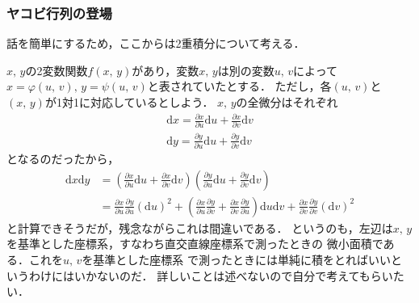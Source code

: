 \subsubsection{ヤコビ行列の登場}
話を簡単にするため，ここからは2重積分について考える．

$x, \, y$の2変数関数$f(x, \, y)$があり，変数$x, \, y$は別の変数$u, \, v$によって
$x=\varphi (u, \, v), \, y=\psi (u, \, v)$と表されていたとする．
ただし，各$(u, \, v)$と$(x, \, y)$が1対1に対応しているとしよう．
$x, \, y$の全微分はそれぞれ
\begin{align*}
\mathrm{d} x = \frac{\partial x}{\partial u} \mathrm{d}u + \frac{\partial x}{\partial v} \mathrm{d}v \\
\mathrm{d} y = \frac{\partial y}{\partial u} \mathrm{d}u + \frac{\partial y}{\partial v} \mathrm{d}v
\end{align*}
となるのだったから，
\begin{align*}
\mathrm{d}x \mathrm{d}y & = \left( 
\frac{\partial x}{\partial u} \mathrm{d}u + \frac{\partial x}{\partial v} \mathrm{d}v \right) 
\left( \frac{\partial y}{\partial u} \mathrm{d}u + \frac{\partial y}{\partial v} \mathrm{d}v \right) \\
& = \frac{\partial x}{\partial u} \frac{\partial y}{\partial u} (\mathrm{d}u)^2
+ \left( \frac{\partial x}{\partial u}\frac{\partial y}{\partial v} + 
\frac{\partial x}{\partial v}\frac{\partial y}{\partial u} \right) \mathrm{d}u \mathrm{d}v +
\frac{\partial x}{\partial v}\frac{\partial y}{\partial v} (\mathrm{d}v)^2
\end{align*}
と計算できそうだが，残念ながらこれは間違いである．
というのも，左辺は$x, \, y$を基準とした座標系，すなわち直交直線座標系で測ったときの
微小面積である．これを$u, \, v$を基準とした座標系
で測ったときには単純に積をとればいいというわけにはいかないのだ．
詳しいことは述べないので自分で考えてもらいたい．

